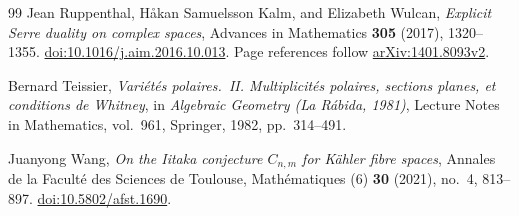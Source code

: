 \begin{thebibliography}{99}
Jean Ruppenthal, H{\aa}kan Samuelsson Kalm, and Elizabeth Wulcan,
\emph{Explicit Serre duality on complex spaces},
Advances in Mathematics \textbf{305} (2017), 1320--1355.
\href{https://doi.org/10.1016/j.aim.2016.10.013}{doi:10.1016/j.aim.2016.10.013}.
Page references follow \href{https://arxiv.org/abs/1401.8093v2}{arXiv:1401.8093v2}.

Bernard Teissier,
\emph{Vari\'et\'es polaires.~II. Multiplicit\'es polaires, sections planes,
et conditions de Whitney},
in \emph{Algebraic Geometry (La R\'abida, 1981)},
Lecture Notes in Mathematics, vol.~961,
Springer, 1982, pp.~314--491.

Juanyong Wang,
\emph{On the Iitaka conjecture $C_{n,m}$ for K\"ahler fibre spaces},
Annales de la Facult\'e des Sciences de Toulouse, Math\'ematiques (6)
\textbf{30} (2021), no.~4, 813--897.
\href{https://doi.org/10.5802/afst.1690}{doi:10.5802/afst.1690}.

\end{thebibliography}

